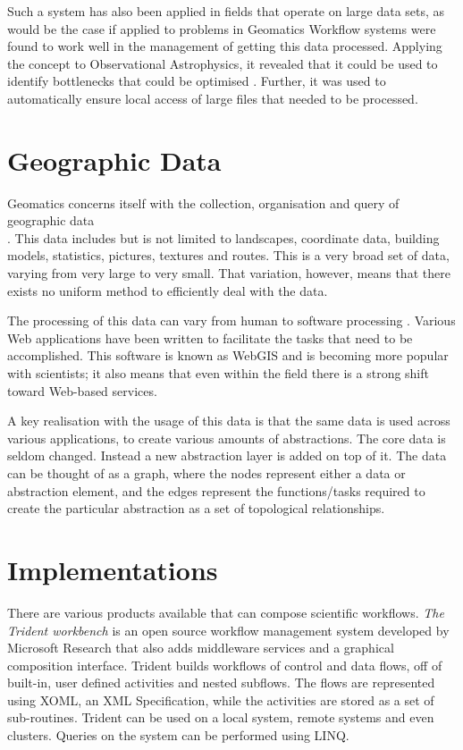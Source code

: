Such a system has also been applied in fields that operate on large data
sets, as would be the case if applied to problems in Geomatics  Workflow systems were found to
work well in the management of getting this data processed. Applying the
concept to Observational Astrophysics, it revealed that it could be used to
identify bottlenecks that could be optimised \cite{Aragon:2009:WMH:1529282.1529491}.  Further, it was used to
automatically ensure local access of large files that needed to be processed.


\section{Geographic Data\label{geo:data}}
Geomatics concerns itself with the collection, organisation and query of
geographic data \\  \cite{DiMartino:2007:TAG:1341012.1341081}.  This data includes
but  is not limited to landscapes, coordinate data, building models,
statistics, pictures, textures and routes. This is a very broad set of data,
varying from very large to very small.  That variation, however, means that
there exists no uniform method to efficiently deal with the data.

The processing of this data can vary from human to software processing
\cite{DiMartino:2007:TAG:1341012.1341081}.  Various Web applications have been
written to facilitate the tasks that need to be accomplished.  This software is
known as WebGIS and is becoming more popular with scientists; it also means
that even within the field there is a strong shift toward Web-based services.

A key realisation with the usage of this data is that the same data is used
across various applications, to create various amounts of
abstractions\cite{ElAdnani:2001:MLF:512161.512177}.  The core data is seldom
changed. Instead a new abstraction layer is added on top of it. The data can be
thought of as a graph, where the nodes represent either a data or abstraction
element, and the edges represent the functions/tasks required to create the
particular abstraction as a set of topological relationships. 

\section{Implementations\label{example:sys}}
There are various products available that can compose scientific workflows.
\emph{The Trident workbench} \cite{Simmhan:2009:BTS:1673063.1673121} is an open
source workflow management system developed by Microsoft Research that also
adds middleware services and a graphical composition interface. Trident builds
workflows of control and data flows, off of built-in, user defined activities
and nested subflows.
The flows are represented using XOML, an XML Specification, while the
activities are stored as a set of sub-routines\cite{Simmhan2011790}. Trident
can be used on a local system, remote systems and even clusters.  Queries on
the system can be performed using LINQ.


